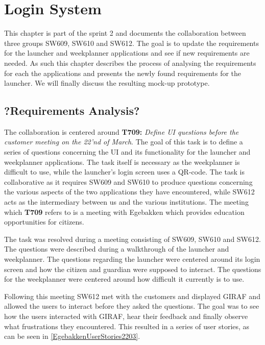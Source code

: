 \chapter{Login System}\label{sec:LoginColab}
This chapter is part of the sprint 2 and documents the collaboration 
between three groups SW609, SW610 and SW612. The goal is to update the
requirements for the launcher and weekplanner applications and see if new
requirements are needed. As such this chapter describes the
process of analysing the requirements for each the applications and presents
the newly found requirements for the launcher. We will finally discuss the
resulting mock-up prototype.

\section{?Requirements Analysis?}


The collaboration is centered around \textbf{T709:} \textit{Define UI questions
before the customer meeting on the 22'nd of March}. The goal of this task is to
define a series of questions concerning the UI and its functionality for the
launcher and weekplanner applications. The task itself is necessary as the
weekplanner is difficult to use, while the launcher's login screen uses a
QR-code. The task is collaborative as it requires SW609 and SW610 to produce
questions concerning the various aspects of the two applications they have
encountered, while SW612 acts as the intermediary between us and the various
institutions. The meeting which \textbf{T709} refers to is a meeting with
Egebakken which provides education opportunities for citizens.\nl

The task was resolved during a meeting consisting of SW609, SW610 and SW612.
The questions were described during a walkthrough of the launcher and
weekplanner. The questions regarding the launcher were centered around its
login screen and how the citizen and guardian were supposed to interact. The
questions for the weekplanner were centered around how difficult it currently
is to use.\nl

Following this meeting SW612 met with the customers and displayed GIRAF and
allowed the users to interact before they asked the questions. The goal was
to see how the users interacted with GIRAF, hear their feedback and finally
observe what frustrations they encountered. This resulted in a series of
user stories, as can be seen in \autoref{EgebakkenUserStories2203}. 


